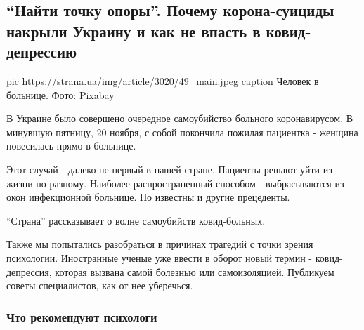  
 
 
 
 

\subsection{\enquote{Найти точку опоры}. Почему корона-суициды накрыли Украину и как не впасть в ковид-депрессию}
\label{sec:23_11_2020.news.ua.strana.1.covid_suicides_ukr}

\ifcmt
pic https://strana.ua/img/article/3020/49_main.jpeg
caption Человек в больнице. Фото: Pixabay 
\fi

 
В Украине было совершено очередное самоубийство больного коронавирусом. В
минувшую пятницу, 20 ноября, с собой покончила пожилая пациентка - женщина
повесилась прямо в больнице.

Этот случай - далеко не первый в нашей стране. Пациенты решают уйти из жизни
по-разному. Наиболее распространенный способом - выбрасываются из окон
инфекционной больнице. Но известны и другие прецеденты.

\enquote{Страна} рассказывает о волне самоубийств ковид-больных.

Также мы попытались разобраться в причинах трагедий с точки зрения
психологии. Иностранные ученые уже ввести в оборот новый термин -
ковид-депрессия, которая вызвана самой болезнью или самоизоляцией.
Публикуем советы специалистов, как от нее уберечься. 


\subsubsection{Что рекомендуют психологи}

